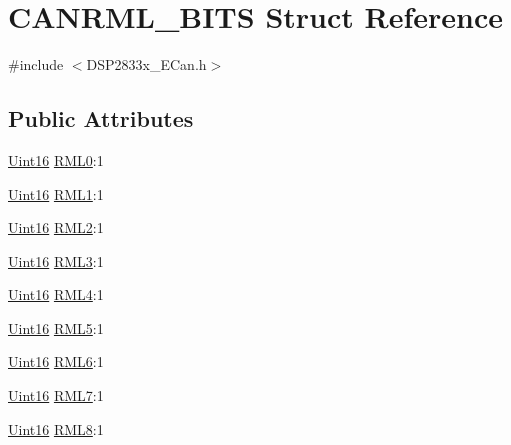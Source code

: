 \hypertarget{struct_c_a_n_r_m_l___b_i_t_s}{}\section{C\+A\+N\+R\+M\+L\+\_\+\+B\+I\+T\+S Struct Reference}
\label{struct_c_a_n_r_m_l___b_i_t_s}


{\ttfamily \#include $<$D\+S\+P2833x\+\_\+\+E\+Can.\+h$>$}

\subsection*{Public Attributes}
\begin{DoxyCompactItemize}
\item 
\hyperlink{_d_s_p2833x___device_8h_a59a9f6be4562c327cbfb4f7e8e18f08b}{Uint16} \hyperlink{struct_c_a_n_r_m_l___b_i_t_s_a07941bd586f80d375094dffedd609040}{R\+M\+L0}\+:1
\item 
\hyperlink{_d_s_p2833x___device_8h_a59a9f6be4562c327cbfb4f7e8e18f08b}{Uint16} \hyperlink{struct_c_a_n_r_m_l___b_i_t_s_a18c3bfc6324e3b8b38991635b2027265}{R\+M\+L1}\+:1
\item 
\hyperlink{_d_s_p2833x___device_8h_a59a9f6be4562c327cbfb4f7e8e18f08b}{Uint16} \hyperlink{struct_c_a_n_r_m_l___b_i_t_s_a22990d6c7934e8c658d2cfe6dc5a073e}{R\+M\+L2}\+:1
\item 
\hyperlink{_d_s_p2833x___device_8h_a59a9f6be4562c327cbfb4f7e8e18f08b}{Uint16} \hyperlink{struct_c_a_n_r_m_l___b_i_t_s_a5af6a2e138a3b9f51bf41d77867e2390}{R\+M\+L3}\+:1
\item 
\hyperlink{_d_s_p2833x___device_8h_a59a9f6be4562c327cbfb4f7e8e18f08b}{Uint16} \hyperlink{struct_c_a_n_r_m_l___b_i_t_s_aa740665274033194411a2986aab8843e}{R\+M\+L4}\+:1
\item 
\hyperlink{_d_s_p2833x___device_8h_a59a9f6be4562c327cbfb4f7e8e18f08b}{Uint16} \hyperlink{struct_c_a_n_r_m_l___b_i_t_s_ae78c63fb05c1eb8debf5fbcf60e304f7}{R\+M\+L5}\+:1
\item 
\hyperlink{_d_s_p2833x___device_8h_a59a9f6be4562c327cbfb4f7e8e18f08b}{Uint16} \hyperlink{struct_c_a_n_r_m_l___b_i_t_s_aa23c5836a053767adcbcd872ed571660}{R\+M\+L6}\+:1
\item 
\hyperlink{_d_s_p2833x___device_8h_a59a9f6be4562c327cbfb4f7e8e18f08b}{Uint16} \hyperlink{struct_c_a_n_r_m_l___b_i_t_s_a262fbd706121418f855e449821b4d8e6}{R\+M\+L7}\+:1
\item 
\hyperlink{_d_s_p2833x___device_8h_a59a9f6be4562c327cbfb4f7e8e18f08b}{Uint16} \hyperlink{struct_c_a_n_r_m_l___b_i_t_s_a208900c3a6e1cbacebf714df8b6f1ba3}{R\+M\+L8}\+:1

\end{DoxyCompactItemize}
